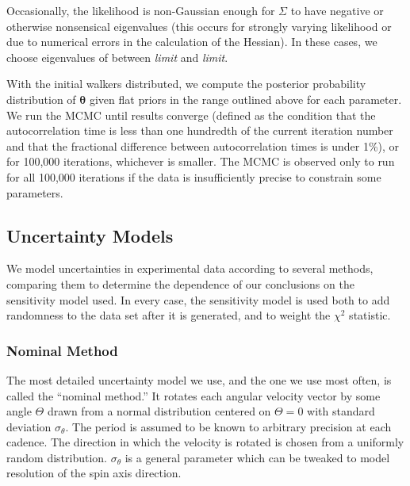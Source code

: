 \documentclass[linenumbers]{aastex631}
\newcommand{\jtd}[1]{{\color{red}\textit{#1}}}
\begin{document}
Occasionally, the likelihood is non-Gaussian enough for $\Sigma$ to have negative or otherwise nonsensical eigenvalues (this occurs for strongly varying likelihood or due to numerical errors in the calculation of the Hessian). In these cases, we choose eigenvalues of between \jtd{limit} and \jtd{limit}.

With the initial walkers distributed, we compute the posterior probability distribution of $\mathbf \theta$ given flat priors in the range outlined above for each parameter. We run the MCMC until results converge (defined as the condition that the autocorrelation time is less than one hundredth of the current iteration number and that the fractional difference between autocorrelation times is under 1\%), or for 100,000 iterations, whichever is smaller. The MCMC is observed only to run for all 100,000 iterations if the data is insufficiently precise to constrain some parameters.


\subsection{Uncertainty Models}
\label{sec:uncertainty-models}
We model uncertainties in experimental data according to several methods, comparing them to determine the dependence of our conclusions on the sensitivity model used. In every case, the sensitivity model is used both to add randomness to the data set after it is generated, and to weight the $\chi^2$ statistic.

\subsubsection{Nominal Method}
The most detailed uncertainty model we use, and the one we use most often, is called the ``nominal method.'' It rotates each angular velocity vector by some angle $\Theta$ drawn from a normal distribution centered on $\Theta=0$ with standard deviation $\sigma_\theta$. The period is assumed to be known to arbitrary precision at each cadence. The direction in which the velocity is rotated is chosen from a uniformly random distribution. $\sigma_\theta$ is a general parameter which can be tweaked to model resolution of the spin axis direction.
\end{document}
